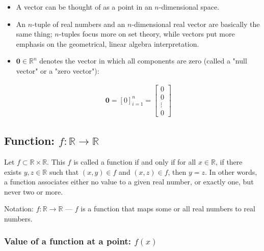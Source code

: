 \documentclass[titlepage]{article}
\begin{document}
        \begin{itemize}
          \item A vector can be thought of as a point in an $n$-dimensional
                space.

          \item An $n$-tuple of real numbers and an $n$-dimensional real vector
                are basically the same thing; $n$-tuples focus more on set
                theory, while vectors put more emphasis on the geometrical,
                linear algebra interpretation.

          \item $\mathbf{0} \in \mathbb{R}^n$ denotes the vector in which all
                components are zero (called a "null vector" or a "zero vector"):

                \begin{align*}
                  \mathbf{0} = \left[ 0 \right]_{i=1}^n
                    = \begin{bmatrix}
                        0 \\
                        0 \\
                        \vdots \\
                        0
                      \end{bmatrix}
                \end{align*}
        \end{itemize}

      \subsection{Function: $f : \mathbb{R} \rightarrow \mathbb{R}$}

        Let $f \subset \mathbb{R} \times \mathbb{R}$. This $f$ is called a
        function if and only if for all $x \in \mathbb{R}$, if there exists
        $y, z \in \mathbb{R}$ such that $(x, y) \in f$ and $(x, z) \in f$, then
        $y = z$. In other words, a function associates either no value to a
        given real number, or exactly one, but never two or more.

        Notation: $f : \mathbb{R} \rightarrow \mathbb{R}$ --- $f$ is a function
        that maps some or all real numbers to real numbers.

        \subsubsection{Value of a function at a point: $f(x)$}
\end{document}
